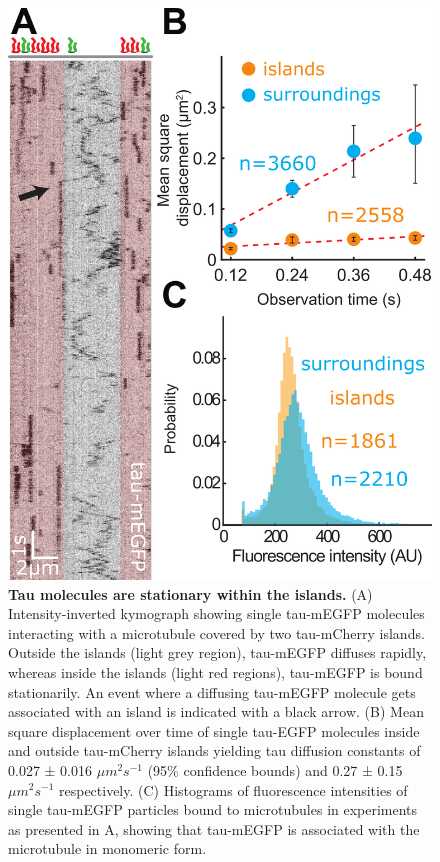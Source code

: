 \begin{figure}
	\centering
	\includegraphics[width=1\linewidth]{Figures/tau_singleMolecules.png}
	\caption[Tau molecules are stationary within the islands.]{
	\textbf{Tau molecules are stationary within the islands.} (A) Intensity-inverted kymograph showing single tau-mEGFP molecules interacting with a microtubule covered by two tau-mCherry islands. Outside the islands (light grey region), tau-mEGFP diffuses rapidly, whereas inside the islands (light red regions), tau-mEGFP is bound stationarily. An event where a diffusing tau-mEGFP molecule gets associated with an island is indicated with a black arrow. (B) Mean square displacement over time of single tau-EGFP molecules inside and outside tau-mCherry islands yielding tau diffusion constants of 0.027 ± 0.016 $\mu m^2s^{-1}$ (95\% confidence bounds) and 0.27 ± 0.15 $\mu m^2s^{-1}$ respectively. (C) Histograms of fluorescence intensities of single tau-mEGFP particles bound to microtubules in experiments as presented in A, showing that tau-mEGFP is associated with the microtubule in monomeric form. 
		}\label{tausingle}
\end{figure}

